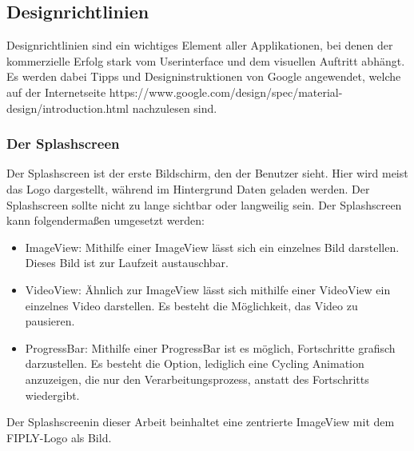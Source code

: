 \documentclass[FIPLY_base.tex]{subfiles}
\begin{document}
	
\subsection{Designrichtlinien}
Designrichtlinien sind ein wichtiges Element aller Applikationen, bei denen der kommerzielle Erfolg stark vom Userinterface und dem visuellen Auftritt abhängt. Es werden dabei Tipps und Designinstruktionen von Google angewendet, welche auf der Internetseite https://www.google.com/design/spec/material-design/introduction.html nachzulesen sind. %

\subsubsection{Der Splashscreen}
Der Splashscreen ist der erste Bildschirm, den der Benutzer sieht. Hier wird meist das Logo dargestellt, während im Hintergrund Daten geladen werden.
Der Splashscreen sollte nicht zu lange sichtbar oder langweilig sein. Der Splashscreen kann folgendermaßen umgesetzt werden:
\begin{itemize}
	\item ImageView: Mithilfe einer ImageView lässt sich ein einzelnes Bild darstellen. Dieses Bild ist zur Laufzeit austauschbar.
	\item VideoView: Ähnlich zur ImageView lässt sich mithilfe einer VideoView ein einzelnes Video darstellen. Es besteht die Möglichkeit, das Video zu pausieren.
	\item ProgressBar: Mithilfe einer ProgressBar ist es möglich, Fortschritte grafisch darzustellen. Es besteht die Option, lediglich eine Cycling Animation anzuzeigen, die nur den Verarbeitungsprozess, anstatt des Fortschritts wiedergibt.
\end{itemize}
Der Splashscreenin dieser Arbeit beinhaltet eine zentrierte ImageView mit dem FIPLY-Logo als Bild.
\end{document}
